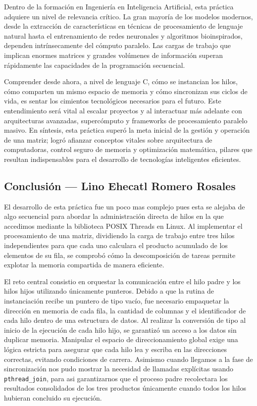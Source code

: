 Dentro de la formación en Ingeniería en Inteligencia Artificial, esta práctica adquiere un nivel de relevancia crítico. La gran mayoría de los modelos modernos, desde la extracción de características en técnicas de procesamiento de lenguaje natural hasta el entrenamiento de redes neuronales y algoritmos bioinspirados, dependen intrínsecamente del cómputo paralelo. Las cargas de trabajo que implican enormes matrices y grandes volúmenes de información superan rápidamente las capacidades de la programación secuencial. 

Comprender desde ahora, a nivel de lenguaje C, cómo se instancian los hilos, cómo comparten un mismo espacio de memoria y cómo sincronizan sus ciclos de vida, es sentar los cimientos tecnológicos necesarios para el futuro. Este entendimiento será vital al escalar proyectos y al interactuar más adelante con arquitecturas avanzadas, 
supercómputo y frameworks de procesamiento paralelo masivo. En síntesis, esta práctica superó la meta inicial de la gestión y operación de una matriz; logró afianzar conceptos vitales sobre arquitectura de computadoras, control seguro de memoria y optimización matemática, pilares que resultan indispensables para el desarrollo de tecnologías inteligentes eficientes.

\clearpage
\subsection{Conclusión — Lino Ehecatl Romero Rosales}
\label{sec:prac03:concl:lino}

El desarrollo de esta práctica fue un poco mas complejo pues esta se alejaba de algo secuencial para abordar la administración directa de hilos en la que accedimos mediante la biblioteca POSIX Threads en Linux. Al implementar el procesamiento de una matriz, dividiendo la carga de trabajo entre tres hilos independientes para que cada uno calculara el producto acumulado de los elementos de su fila, se comprobó cómo la descomposición de tareas permite explotar la memoria compartida de manera eficiente.

El reto central consistio en orquestar la comunicación entre el hilo padre y los hilos hijos utilizando únicamente punteros. Debido a que la rutina de instanciación recibe un puntero de tipo vacío, fue necesario empaquetar la dirección en memoria de cada fila, la cantidad de columnas y el identificador de cada hilo dentro de una estructura de datos. Al realizar la conversión de tipo al inicio de la ejecución de cada hilo hijo, se garantizó un acceso a los datos sin duplicar memoria. Manipular el espacio de direccionamiento global exige una lógica estricta para asegurar que cada hilo lea y escriba en las direcciones correctas, evitando condiciones de carrera. Asimismo cuando llegamos a la fase de sincronización nos pudo mostrar la necesidad de llamadas explícitas usando \texttt{pthread\_join}, para asi garantizarnos que el proceso padre recolectara los resultados consolidados de los tres productos únicamente cuando todos los hilos hubieran concluido su ejecución.

